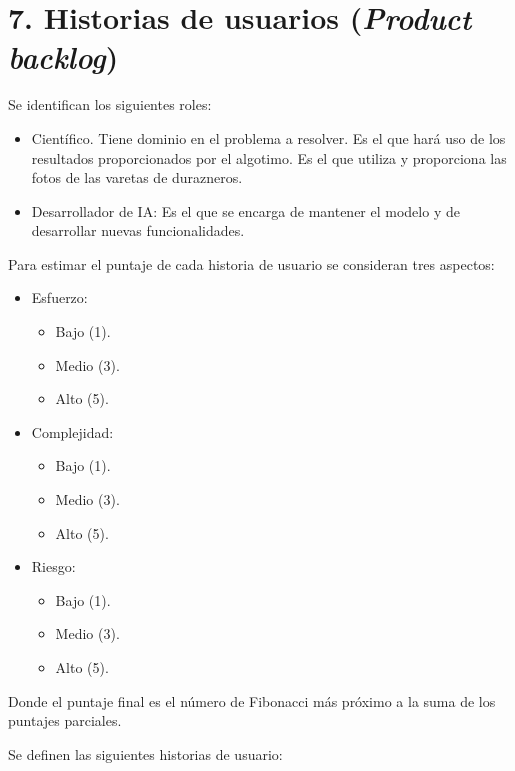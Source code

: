 \documentclass[
11pt, %
]{charter}
\begin{document}
\section{7. Historias de usuarios (\textit{Product backlog})}
\label{sec:backlog}

Se identifican los siguientes roles:

\begin{itemize}
	\item Científico. Tiene dominio en el problema a resolver. Es el que hará uso de los resultados proporcionados por el algotimo. Es el que utiliza y proporciona las fotos de las varetas de durazneros. 
	\item Desarrollador de IA: Es el que se encarga de mantener el modelo y de desarrollar nuevas funcionalidades.
\end{itemize}

Para estimar el puntaje de cada historia de usuario se consideran tres aspectos:

\begin{itemize}
	\item Esfuerzo:
	\begin{itemize}
	\item Bajo (1). 
	\item Medio (3). 
	\item Alto (5).
\end{itemize}
	\item Complejidad: 
	\begin{itemize}
	\item Bajo (1).
	\item Medio (3). 
	\item Alto (5).
\end{itemize}
	\item Riesgo:
	\begin{itemize}
	\item Bajo (1). 
	\item Medio (3). 
	\item Alto (5).
\end{itemize}
\end{itemize}

Donde el puntaje final es el número de Fibonacci más próximo a la suma de los puntajes parciales.

Se definen las siguientes historias de usuario:
\end{document}
